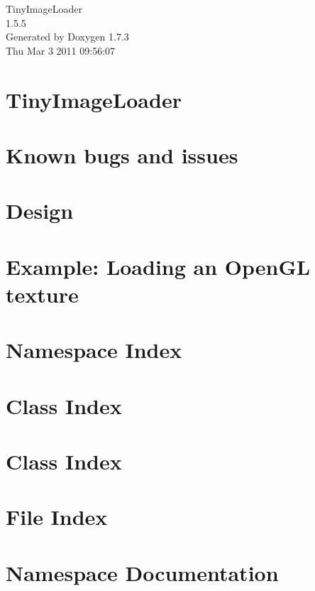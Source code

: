 \documentclass[a4paper]{book}
\begin{document}
\hypersetup{pageanchor=false}
\begin{titlepage}
\vspace*{7cm}
\begin{center}
{\Large TinyImageLoader \\[1ex]\large 1.5.5 }\\
\vspace*{1cm}
{\large Generated by Doxygen 1.7.3}\\
\vspace*{0.5cm}
{\small Thu Mar 3 2011 09:56:07}\\
\end{center}
\end{titlepage}
\clearemptydoublepage
{}
\tableofcontents
\clearemptydoublepage
{}
\hypersetup{pageanchor=true}
\chapter{TinyImageLoader}
\label{index}\hypertarget{index}{}
\chapter{Known bugs and issues}
\label{bugs}
\hypertarget{bugs}{}

\chapter{Design}
\label{design}
\hypertarget{design}{}

\chapter{Example: Loading an OpenGL texture}
\label{example1}
\hypertarget{example1}{}

\chapter{Namespace Index}

\chapter{Class Index}

\chapter{Class Index}

\chapter{File Index}

\chapter{Namespace Documentation}


\end{document}
